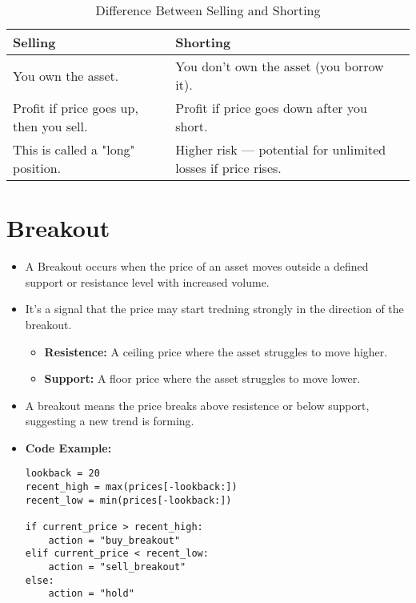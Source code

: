 \documentclass{article}
\begin{document}
\begin{itemize}
\begin{itemize}
\begin{itemize}
        \end{itemize}
        \begin{table}[h!]
        \centering
        \begin{tabular}{|p{5cm}|p{7cm}|}
            \hline
            \textbf{Selling} & \textbf{Shorting} \\
            \hline
            You own the asset. & You don’t own the asset (you borrow it). \\
            \hline
            Profit if price goes up, then you sell. & Profit if price goes down after you short. \\
            \hline
            This is called a "long" position. & Higher risk — potential for unlimited losses if price rises. \\
            \hline
        \end{tabular}
        \caption{Difference Between Selling and Shorting}
        \end{table}
    \end{itemize}        
\end{itemize}

\section*{Breakout}
\begin{itemize}
    \item A Breakout occurs when the price of an asset moves outside a defined support or resistance level with increased volume.
    \item It's a signal that the price may start tredning strongly in the direction of the breakout.
    \begin{itemize}
        \item \textbf{Resistence: }A ceiling price where the asset struggles to move higher.
        \item \textbf{Support: }A floor price where the asset struggles to move lower.
    \end{itemize}
    \item A breakout means the price breaks above resistence or below support, suggesting a new trend is forming.
    \item \textbf{Code Example:}
    \begin{lstlisting}
lookback = 20
recent_high = max(prices[-lookback:])
recent_low = min(prices[-lookback:])

if current_price > recent_high:
    action = "buy_breakout"
elif current_price < recent_low:
    action = "sell_breakout"
else:
    action = "hold"
    \end{lstlisting}
\end{itemize}
\end{document}
